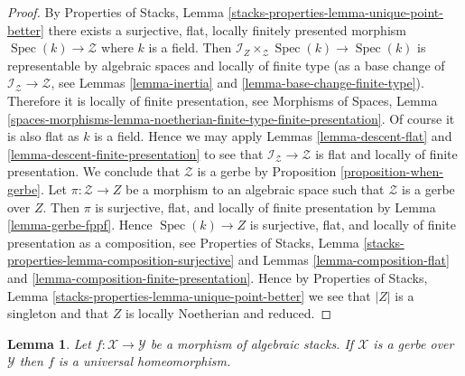 \documentclass{stacks-project}
\theoremstyle{plain}
\newtheorem{lemma}[subsection]{Lemma}
\theoremstyle{definition}
\theoremstyle{remark}
\numberwithin{equation}{subsection}
\def\Spec{\mathop{\mathrm{Spec}}}
\begin{document}
\begin{proof}
By
Properties of Stacks, Lemma \ref{stacks-properties-lemma-unique-point-better}
there exists a surjective, flat, locally finitely presented morphism
$\Spec(k) \to \mathcal{Z}$ where $k$ is a field.
Then $\mathcal{I}_Z \times_\mathcal{Z} \Spec(k) \to \Spec(k)$
is representable by algebraic spaces and
locally of finite type (as a base change of
$\mathcal{I}_\mathcal{Z} \to \mathcal{Z}$, see
Lemmas \ref{lemma-inertia} and \ref{lemma-base-change-finite-type}).
Therefore it is locally of finite presentation, see
Morphisms of Spaces, Lemma
\ref{spaces-morphisms-lemma-noetherian-finite-type-finite-presentation}.
Of course it is also flat as $k$ is a field. Hence we may apply
Lemmas \ref{lemma-descent-flat} and
\ref{lemma-descent-finite-presentation}
to see that $\mathcal{I}_\mathcal{Z} \to \mathcal{Z}$ is flat and
locally of finite presentation. We conclude that $\mathcal{Z}$
is a gerbe by
Proposition \ref{proposition-when-gerbe}.
Let $\pi : \mathcal{Z} \to Z$ be a morphism to an algebraic space such
that $\mathcal{Z}$ is a gerbe over $Z$. Then $\pi$ is surjective, flat, and
locally of finite presentation by
Lemma \ref{lemma-gerbe-fppf}.
Hence $\Spec(k) \to Z$ is surjective, flat, and locally of finite
presentation as a composition, see
Properties of Stacks,
Lemma \ref{stacks-properties-lemma-composition-surjective}
and
Lemmas \ref{lemma-composition-flat} and
\ref{lemma-composition-finite-presentation}.
Hence by
Properties of Stacks, Lemma \ref{stacks-properties-lemma-unique-point-better}
we see that $|Z|$ is a singleton and that $Z$ is locally Noetherian
and reduced.
\end{proof}

\begin{lemma}
\label{lemma-gerbe-bijection-points}
Let $f : \mathcal{X} \to \mathcal{Y}$ be a morphism of algebraic stacks.
If $\mathcal{X}$ is a gerbe over $\mathcal{Y}$ then $f$ is a
universal homeomorphism.
\end{lemma}
\end{document}
